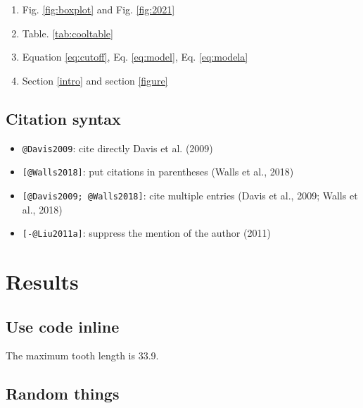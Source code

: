 \documentclass[review]{elsarticle} %
\providecommand{\tightlist}{%
  \setlength{\itemsep}{0pt}\setlength{\parskip}{0pt}}
\newenvironment{Shaded}{\begin{snugshade}}{\end{snugshade}}
\newcommand{\BaseNTok}[1]{\textcolor[rgb]{0.00,0.00,0.81}{#1}}
\newcommand{\NormalTok}[1]{#1}
\begin{document}
\begin{enumerate}
\def\labelenumi{\arabic{enumi}.}
\tightlist
\item
  Fig. \ref{fig:boxplot} and Fig. \ref{fig:2021}
\item
  Table. \ref{tab:cooltable}
\item
  Equation \ref{eq:cutoff}, Eq. \ref{eq:model}, Eq. \ref{eq:modela}
\item
  Section \ref{intro} and section \ref{figure}
\end{enumerate}

\subsection{Citation syntax}\label{citation-syntax}

\begin{itemize}
\tightlist
\item
  \texttt{@Davis2009}: cite directly Davis et al. (2009)
\item
  \texttt{{[}@Walls2018{]}}: put citations in parentheses (Walls et al.,
  2018)
\item
  \texttt{{[}@Davis2009;\ @Walls2018{]}}: cite multiple entries (Davis
  et al., 2009; Walls et al., 2018)
\item
  \texttt{{[}-@Liu2011a{]}}: suppress the mention of the author (2011)
\end{itemize}

\section{Results}\label{result}

\subsection{Use code inline}\label{use-code-inline}

\begin{Shaded}
\end{Shaded}

The maximum tooth length is 33.9.

\subsection{Random things}\label{random-things}
\end{document}
